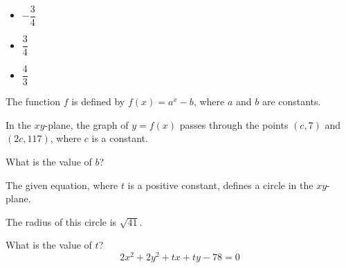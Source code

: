 \begin{itemize}
\item[I] \(-\dfrac{3}{4}\)
\item[II] \(\dfrac{3}{4}\)
\item[III] \(\dfrac{4}{3}\)
\end{itemize}

\vspace{0.75em}


\vspace{2em}
\newpage

\noindent\markforreview
\vspace{1em}

The function \(f\) is defined by \(f(x) = a^x - b\), where \(a\) and \(b\) are constants.

In the \(xy\)-plane, the graph of \(y = f(x)\) passes through the points \((c, 7)\) and \((2c, 117)\), where \(c\) is a constant.

What is the value of \(b\)?

\vspace{2em}
\newpage

\noindent\markforreview
\vspace{1em}

The given equation, where \(t\) is a positive constant, defines a circle in the \(xy\)-plane.

The radius of this circle is \(\sqrt{41}\).

What is the value of \(t\)?
\[
2x^2 + 2y^2 + tx + ty - 78 = 0
\]
